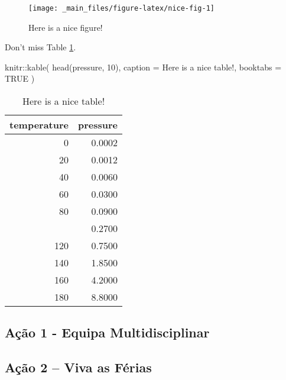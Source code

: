 \documentclass[
]{book}
\newenvironment{Shaded}{\begin{snugshade}}{\end{snugshade}}
\newcommand{\AttributeTok}[1]{\textcolor[rgb]{0.77,0.63,0.00}{#1}}
\newcommand{\ConstantTok}[1]{\textcolor[rgb]{0.00,0.00,0.00}{#1}}
\newcommand{\DecValTok}[1]{\textcolor[rgb]{0.00,0.00,0.81}{#1}}
\newcommand{\FunctionTok}[1]{\textcolor[rgb]{0.00,0.00,0.00}{#1}}
\newcommand{\NormalTok}[1]{#1}
\newcommand{\SpecialCharTok}[1]{\textcolor[rgb]{0.00,0.00,0.00}{#1}}
\newcommand{\StringTok}[1]{\textcolor[rgb]{0.31,0.60,0.02}{#1}}
\theoremstyle{definition}
\theoremstyle{definition}
\theoremstyle{definition}
\theoremstyle{definition}
\theoremstyle{remark}
\begin{document}
\begin{figure}

{\centering \texttt{[image: \_main\_files/figure-latex/nice-fig-1]} 

}

\caption{Here is a nice figure!}\label{fig:nice-fig}
\end{figure}

Don't miss Table \ref{tab:nice-tab}.

\begin{Shaded}
\begin{Highlighting}[]
\NormalTok{knitr}\SpecialCharTok{::}\FunctionTok{kable}\NormalTok{(}
  \FunctionTok{head}\NormalTok{(pressure, }\DecValTok{10}\NormalTok{), }\AttributeTok{caption =} \StringTok{\textquotesingle{}Here is a nice table!\textquotesingle{}}\NormalTok{,}
  \AttributeTok{booktabs =} \ConstantTok{TRUE}
\NormalTok{)}
\end{Highlighting}
\end{Shaded}

\begin{table}

\caption{\label{tab:nice-tab}Here is a nice table!}
\centering
\begin{tabular}[t]{rr}
\toprule
temperature & pressure\\
\midrule
0 & 0.0002\\
20 & 0.0012\\
40 & 0.0060\\
60 & 0.0300\\
80 & 0.0900\\
\addlinespace
100 & 0.2700\\
120 & 0.7500\\
140 & 1.8500\\
160 & 4.2000\\
180 & 8.8000\\
\bottomrule
\end{tabular}
\end{table}

\hypertarget{auxe7uxe3o-1---equipa-multidisciplinar}{%
\subsection{Ação 1 - Equipa Multidisciplinar}\label{auxe7uxe3o-1---equipa-multidisciplinar}}

\hypertarget{auxe7uxe3o-2-viva-as-fuxe9rias}{%
\subsection{Ação 2 -- Viva as Férias}\label{auxe7uxe3o-2-viva-as-fuxe9rias}}
\end{document}
